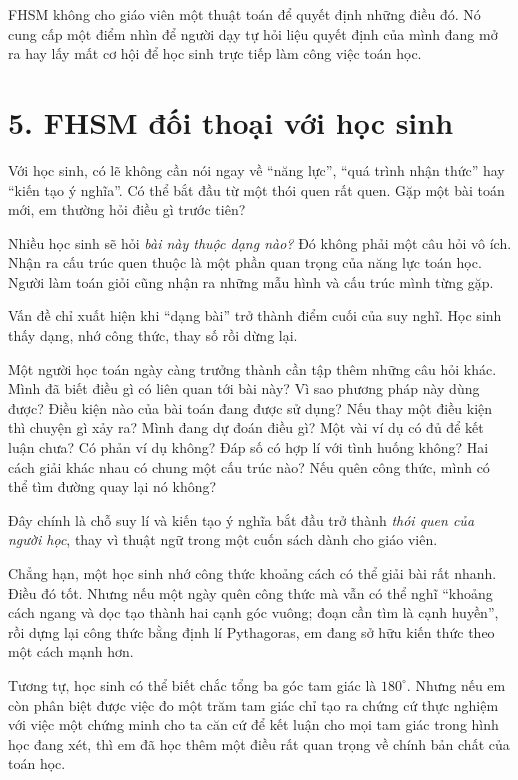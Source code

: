 FHSM không cho giáo viên một thuật toán để quyết định những điều đó. Nó cung cấp một điểm nhìn để người dạy tự hỏi liệu quyết định của mình đang mở ra hay lấy mất cơ hội để học sinh trực tiếp làm công việc toán học.

\section*{5. FHSM đối thoại với học sinh}

Với học sinh, có lẽ không cần nói ngay về ``năng lực'', ``quá trình nhận thức'' hay ``kiến tạo ý nghĩa''. Có thể bắt đầu từ một thói quen rất quen. Gặp một bài toán mới, em thường hỏi điều gì trước tiên?

Nhiều học sinh sẽ hỏi \emph{bài này thuộc dạng nào?} Đó không phải một câu hỏi vô ích. Nhận ra cấu trúc quen thuộc là một phần quan trọng của năng lực toán học. Người làm toán giỏi cũng nhận ra những mẫu hình và cấu trúc mình từng gặp.

Vấn đề chỉ xuất hiện khi ``dạng bài'' trở thành điểm cuối của suy nghĩ. Học sinh thấy dạng, nhớ công thức, thay số rồi dừng lại.

Một người học toán ngày càng trưởng thành cần tập thêm những câu hỏi khác. Mình đã biết điều gì có liên quan tới bài này? Vì sao phương pháp này dùng được? Điều kiện nào của bài toán đang được sử dụng? Nếu thay một điều kiện thì chuyện gì xảy ra? Mình đang dự đoán điều gì? Một vài ví dụ có đủ để kết luận chưa? Có phản ví dụ không? Đáp số có hợp lí với tình huống không? Hai cách giải khác nhau có chung một cấu trúc nào? Nếu quên công thức, mình có thể tìm đường quay lại nó không?

Đây chính là chỗ suy lí và kiến tạo ý nghĩa bắt đầu trở thành \emph{thói quen của người học}, thay vì thuật ngữ trong một cuốn sách dành cho giáo viên.

Chẳng hạn, một học sinh nhớ công thức khoảng cách có thể giải bài rất nhanh. Điều đó tốt. Nhưng nếu một ngày quên công thức mà vẫn có thể nghĩ ``khoảng cách ngang và dọc tạo thành hai cạnh góc vuông; đoạn cần tìm là cạnh huyền'', rồi dựng lại công thức bằng định lí Pythagoras, em đang sở hữu kiến thức theo một cách mạnh hơn.

Tương tự, học sinh có thể biết chắc tổng ba góc tam giác là $180^\circ$. Nhưng nếu em còn phân biệt được việc đo một trăm tam giác chỉ tạo ra chứng cứ thực nghiệm với việc một chứng minh cho ta căn cứ để kết luận cho mọi tam giác trong hình học đang xét, thì em đã học thêm một điều rất quan trọng về chính bản chất của toán học.

